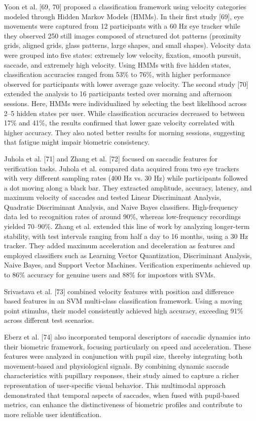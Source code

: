 \documentclass{article}
\begin{document}
Yoon et al. [69, 70] proposed a classification framework using velocity categories modeled through Hidden Markov Models (HMMs). 
In their first study [69], eye movements were captured from 12 participants with a 60 Hz eye tracker while they observed 250 still images composed of structured dot patterns (proximity grids, aligned grids, glass patterns, large shapes, and small shapes).
Velocity data were grouped into five states: extremely low velocity, fixation, smooth pursuit, saccade, and extremely high velocity. 
Using HMMs with five hidden states, classification accuracies ranged from 53\% to 76\%, with higher performance observed for participants with lower average gaze velocity. 
The second study [70] extended the analysis to 16 participants tested over morning and afternoon sessions. 
Here, HMMs were individualized by selecting the best likelihood across 2–5 hidden states per user.
While classification accuracies decreased to between 17\% and 41\%, the results confirmed that lower gaze velocity correlated with higher accuracy. 
They also noted better results for morning sessions, suggesting that fatigue might impair biometric consistency.

Juhola et al. [71] and Zhang et al. [72] focused on saccadic features for verification tasks. Juhola et al. compared data acquired from two eye trackers with very different sampling rates (400 Hz vs. 30 Hz) while participants followed a dot moving along a black bar.
They extracted amplitude, accuracy, latency, and maximum velocity of saccades and tested Linear Discriminant Analysis, Quadratic Discriminant Analysis, and Naive Bayes classifiers. 
High-frequency data led to recognition rates of around 90\%, whereas low-frequency recordings yielded 70–90\%. 
Zhang et al. extended this line of work by analyzing longer-term stability, with test intervals ranging from half a day to 16 months, using a 30 Hz tracker.
They added maximum acceleration and deceleration as features and employed classifiers such as Learning Vector Quantization, Discriminant Analysis, Naive Bayes, and Support Vector Machines. 
Verification experiments achieved up to 86\% accuracy for genuine users and 88\% for impostors with SVMs.

Srivastava et al. [73] combined velocity features with position and difference based features in an SVM multi-class classification framework. 
Using a moving point stimulus, their model consistently achieved high accuracy, exceeding 91\% across different test scenarios.

Eberz et al. [74] also incorporated temporal descriptors of saccadic dynamics into their biometric framework, focusing particularly on speed and acceleration.
These features were analyzed in conjunction with pupil size, thereby integrating both movement-based and physiological signals.
By combining dynamic saccade characteristics with pupillary responses, their study aimed to capture a richer representation of user-specific visual behavior. 
This multimodal approach demonstrated that temporal aspects of saccades, when fused with pupil-based metrics, can enhance the distinctiveness of biometric profiles and contribute to more reliable user identification.
\end{document}
